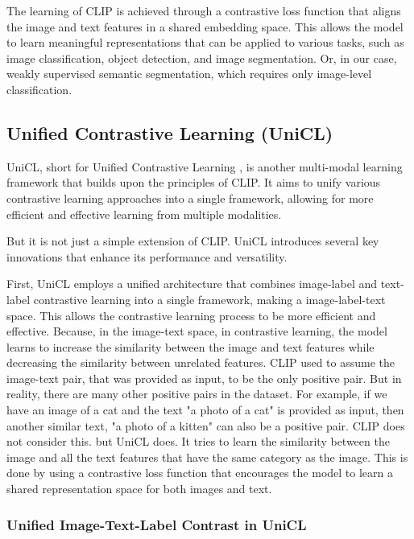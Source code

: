 The learning of CLIP is achieved through a contrastive loss function that aligns the image and text features in a shared embedding space. This allows the model to learn meaningful representations that can be applied to various tasks, such as image classification, object detection, and image segmentation. Or, in our case, weakly supervised semantic segmentation, which requires only image-level classification.

\subsection{Unified Contrastive Learning (UniCL)}
\label{subsec:unicl}

UniCL, short for Unified Contrastive Learning \cite{vl_unicl}, is another multi-modal learning framework that builds upon the principles of CLIP. It aims to unify various contrastive learning approaches into a single framework, allowing for more efficient and effective learning from multiple modalities.

But it is not just a simple extension of CLIP. UniCL introduces several key innovations that enhance its performance and versatility.

First, UniCL employs a unified architecture that combines image-label and text-label contrastive learning into a single framework, making a image-label-text space. This allows the contrastive learning process to be more efficient and effective. Because, in the image-text space, in contrastive learning, the model learns to increase the similarity between the image and text features while decreasing the similarity between unrelated features. CLIP used to assume the image-text pair, that was provided as input, to be the only positive pair. But in reality, there are many other positive pairs in the dataset. For example, if we have an image of a cat and the text "a photo of a cat" is provided as input, then another similar text, "a photo of a kitten" can also be a positive pair. CLIP does not consider this. but UniCL does. It tries to learn the similarity between the image and all the text features that have the same category as the image. This is done by using a contrastive loss function that encourages the model to learn a shared representation space for both images and text.

\subsubsection{Unified Image-Text-Label Contrast in UniCL}
\label{subsec:unified_image_text_label_contrast}

